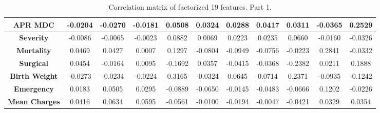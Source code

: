 \documentclass[10pt,twocolumn,letterpaper]{article}
\begin{document}
\begin{landscape}
\begin{table}[]
\begin{tabular}{|c|c|c|c|c|c|c|c|c|c|c|}
\textbf{APR MDC}      & -0.0204                        & -0.0270                          & -0.0181                            & 0.0508                        & 0.0324                           & 0.0288                         & 0.0417                              & 0.0311                              & -0.0365                               & 0.2529                              \\ \hline
\textbf{Severity}     & -0.0086                        & -0.0065                          & -0.0023                            & 0.0882                        & 0.0069                           & 0.0223                         & 0.0235                              & 0.0660                              & -0.0160                               & -0.0326                             \\ \hline
\textbf{Mortality}    & 0.0469                         & 0.0427                           & 0.0007                             & 0.1297                        & -0.0804                          & -0.0949                        & -0.0756                             & -0.0223                             & 0.2841                                & -0.0332                             \\ \hline
\textbf{Surgical}     & 0.0454                         & -0.0164                          & 0.0095                             & -0.1692                       & 0.0357                           & -0.0415                        & -0.0368                             & -0.2382                             & 0.0211                                & 0.1888                              \\ \hline
\textbf{Birth Weight} & -0.0273                        & -0.0234                          & -0.0224                            & 0.3165                        & -0.0324                          & 0.0645                         & 0.0714                              & 0.2371                              & -0.0935                               & -0.1242                             \\ \hline
\textbf{Emergency}    & 0.0183                         & 0.0505                           & 0.0295                             & -0.0889                       & -0.0650                          & -0.0145                        & -0.0483                             & -0.0666                             & 0.1202                                & -0.0226                             \\ \hline
\textbf{Mean Charges} & 0.0416                         & 0.0634                           & 0.0595                             & -0.0561                       & -0.0100                          & -0.0194                        & -0.0047                             & -0.0421                             & 0.0329                                & 0.0354                              \\ \hline
\end{tabular}
\caption{Correlation matrix of factorized 19 features. Part 1.}
\label{CM1}
\end{table}
\end{landscape}
\end{document}

